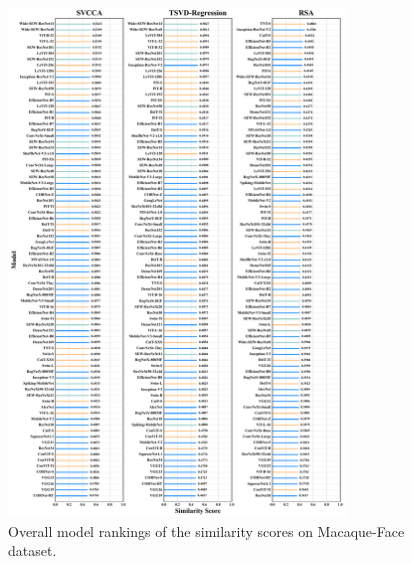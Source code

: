 \documentclass[letterpaper]{article} %
\begin{document}
\begin{figure}[t]
	\centering
	\includegraphics[width=0.80\textwidth]{figs/model_rank_macaque_face_color.pdf}
	\caption{Overall model rankings of the similarity scores on Macaque-Face dataset.}
	\label{Fig.model_rank_macaque_face}
\end{figure}
\end{document}
